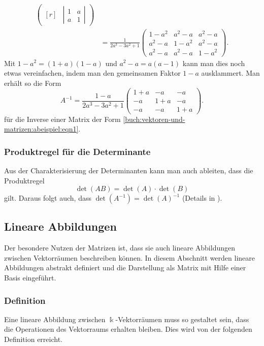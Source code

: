 \begin{beispiel}
\begin{align*}
\begin{pmatrix*}[r]
&
\left|\begin{matrix}1&a\\a&1\end{matrix}\right|
\end{pmatrix*}
\\
&=
\frac{1}{2a^3-3a^2+1}
\begin{pmatrix}
1-a^2 & a^2-a & a^2-a\\
a^2-a & 1-a^2 & a^2-a\\
a^2-a & a^2-a & 1-a^2
\end{pmatrix}.
\end{align*}
Mit $1-a^2=(1+a)(1-a)$ und $a^2-a=a(a-1)$ kann man dies noch etwas
vereinfachen, indem man den gemeinsamen Faktor $1-a$ ausklammert.
Man erhält so die Form
\begin{equation}
A^{-1}
=
\frac{1-a}{2a^3-3a^2+1}
\begin{pmatrix}
1+a &  -a &  -a \\
 -a & 1+a &  -a \\
 -a &  -a & 1+a
\end{pmatrix}.
\label{buch:vektoren-und-matrizen:abeispiel:eqn2}
\end{equation}
für die Inverse einer Matrix der Form
\eqref{buch:vektoren-und-matrizen:abeispiel:eqn1}.
\end{beispiel}

\subsubsection{Produktregel für die Determinante}
Aus der Charakterisierung der Determinanten kann man auch ableiten,
dass  die Produktregel 
%
\[
\det (AB) = \det(A) \cdot \det(B)
\]
gilt.
Daraus folgt auch, dass $\det(A^{-1})=\det(A)^{-1}$
(Details in \cite{buch:linalg}).


%
%
\subsection{Lineare Abbildungen
\label{buch:grundlagen:subsection:lineare-abbildungen}}
Der besondere Nutzen der Matrizen ist, dass sie auch lineare Abbildungen
zwischen Vektorräumen beschreiben können.
In diesem Abschnitt werden lineare Abbildungen abstrakt definiert
und die Darstellung als Matrix mit Hilfe einer Basis eingeführt.


\subsubsection{Definition}
Eine lineare Abbildung zwischen $\Bbbk$-Vektorräumen muss so gestaltet sein,
dass die Operationen des Vektorraums erhalten bleiben.
Dies wird von der folgenden Definition erreicht.

